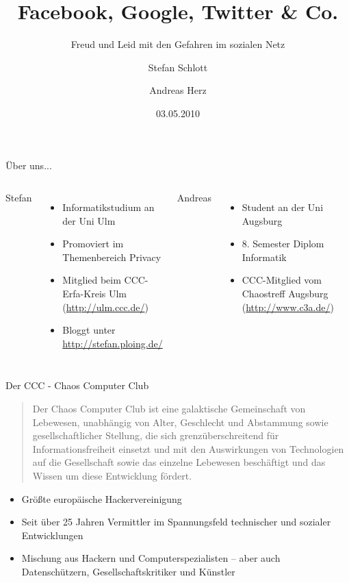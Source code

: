 \documentclass[hyperref={pdfpagelabels=false}]{beamer}
\title{Facebook, Google, Twitter \& Co.}
\subtitle{Freud und Leid mit den Gefahren im sozialen Netz}
\author{%
		Stefan Schlott\inst{1}\and%
		Andreas Herz\inst{2}%
}
\institute{%
	\inst{1}\email{stefan.schlott}{ulm.ccc.de}\and%
	\inst{2}\email{andi}{geekosphere.org}%
}
\date{03.05.2010}
\begin{document}
\begin{frame}[plain]
\titlepage
\end{frame}

\begin{frame}{Über uns...}
	\begin{columns}[t]
			Stefan
			\begin{itemize}
				\item Informatikstudium an der Uni Ulm
				\item Promoviert im Themenbereich Privacy
				\item Mitglied beim CCC-Erfa-Kreis Ulm (\url{http://ulm.ccc.de/})
				\item Bloggt unter \\ \url{http://stefan.ploing.de/}
			\end{itemize}
			Andreas
			\begin{itemize}
				\item Student an der Uni Augsburg
				\item 8. Semester Diplom Informatik
				\item CCC-Mitglied vom Chaostreff Augsburg (\url{http://www.c3a.de/})
			\end{itemize}
	\end{columns}
	\vfill
\end{frame}

\begin{frame}{Der CCC - Chaos Computer Club}
	\begin{quotation}\small
		Der Chaos Computer Club ist eine galaktische Gemeinschaft von Lebewesen, unabhängig von Alter, Geschlecht und Abstammung sowie gesellschaftlicher Stellung, die sich grenzüberschreitend für Informationsfreiheit einsetzt und mit den Auswirkungen von Technologien auf die Gesellschaft sowie das einzelne Lebewesen beschäftigt und das Wissen um diese Entwicklung fördert.
	\end{quotation}

	\begin{itemize}
		\item Größte europäische Hackervereinigung
		\item Seit über 25 Jahren Vermittler im Spannungsfeld technischer und sozialer Entwicklungen
		\item Mischung aus Hackern und Computerspezialisten -- aber auch Datenschützern, Gesellschaftskritiker und Künstler
	\end{itemize}
\end{frame}
\end{document}
